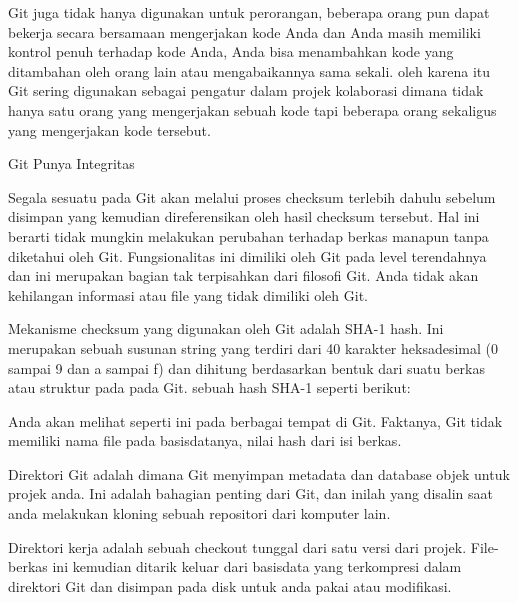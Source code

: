  \vspace{\baselineskip}
\noindent 
 \hspace*{0.5in} Git juga tidak hanya digunakan untuk perorangan, beberapa orang pun dapat bekerja secara bersamaan mengerjakan kode Anda dan Anda masih memiliki kontrol penuh terhadap kode Anda, Anda bisa menambahkan kode yang ditambahan oleh orang lain atau mengabaikannya sama sekali. oleh karena itu Git sering digunakan sebagai pengatur dalam projek kolaborasi dimana tidak hanya satu orang yang mengerjakan sebuah kode tapi beberapa orang sekaligus yang mengerjakan kode tersebut. \par
 \vspace{\baselineskip}
\noindent 
 \hspace*{0.5in} Git Punya Integritas \par
\noindent 
Segala sesuatu pada Git akan melalui proses checksum terlebih dahulu sebelum disimpan yang kemudian direferensikan oleh hasil checksum tersebut. Hal ini berarti tidak mungkin melakukan perubahan terhadap berkas manapun tanpa diketahui oleh Git. Fungsionalitas ini dimiliki oleh Git pada level terendahnya dan ini merupakan bagian tak terpisahkan dari filosofi Git. Anda tidak akan kehilangan informasi atau file yang tidak dimiliki oleh Git. \par
\vspace{\baselineskip}
\noindent 
 \hspace*{0.5in} Mekanisme checksum yang digunakan oleh Git adalah SHA-1 hash. Ini merupakan sebuah susunan string yang terdiri dari 40 karakter heksadesimal (0 sampai 9 dan a sampai f) dan dihitung berdasarkan bentuk dari suatu berkas atau struktur pada pada Git. sebuah hash SHA-1 seperti berikut: \par
 \vspace{\baselineskip}
\noindent 
Anda akan melihat seperti ini pada berbagai tempat di Git. Faktanya, Git tidak memiliki nama file pada basisdatanya, nilai hash dari isi berkas. \par
\vspace{\baselineskip}
\noindent 
Direktori Git adalah dimana Git menyimpan metadata dan database objek untuk projek anda. Ini adalah bahagian penting dari Git, dan inilah yang disalin saat anda melakukan kloning sebuah repositori dari komputer lain. \par
\vspace{\baselineskip}
\noindent 
Direktori kerja adalah sebuah checkout tunggal dari satu versi dari projek. File-berkas ini kemudian ditarik keluar dari basisdata yang terkompresi dalam direktori Git dan disimpan pada disk untuk anda pakai atau modifikasi. \par
